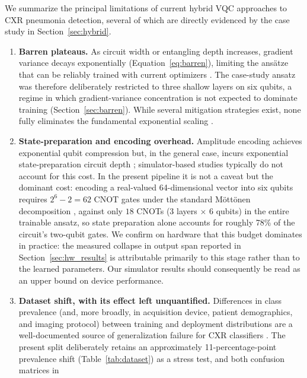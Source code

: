 \documentclass[11pt,a4paper]{article}
\begin{document}
We summarize the principal limitations of current hybrid VQC approaches to CXR
pneumonia detection, several of which are directly evidenced by the case study
in Section~\ref{sec:hybrid}.

\begin{enumerate}[leftmargin=1.4em]
  \item \textbf{Barren plateaus.}  As circuit width or entangling depth
    increases, gradient variance decays exponentially
    (Equation~\ref{eq:barren}), limiting the ansätze that can be reliably
    trained with current optimizers \cite{mcclean2018,cerezo2021,marrero2021}.
    The case-study ansatz was therefore deliberately restricted to three
    shallow layers on six qubits, a regime in which gradient-variance
    concentration is not expected to dominate training
    (Section~\ref{sec:barren}).  While several mitigation strategies exist,
    none fully eliminates the fundamental exponential scaling
    \cite{kashif2023}.
  \item \textbf{State-preparation and encoding overhead.}  Amplitude encoding
    achieves exponential qubit compression but, in the general case, incurs
    exponential state-preparation circuit depth \cite{aaronson2015};
    simulator-based studies typically do not account for this cost.  In the
    present pipeline it is not a caveat but the dominant cost: encoding a
    real-valued 64-dimensional vector into six qubits requires $2^6 - 2 = 62$
    CNOT gates under the standard M\"ott\"onen decomposition
    \cite{mottonen2005}, against only $18$ CNOTs (3 layers $\times$ 6 qubits)
    in the entire trainable ansatz, so state preparation alone accounts for
    roughly 78\% of the circuit's two-qubit gates.  We confirm on hardware
    that this budget dominates in practice: the measured collapse in output
    span reported in Section~\ref{sec:hw_results} is attributable primarily to
    this stage rather than to the learned parameters.  Our simulator results
    should consequently be read as an upper bound on device performance.
  \item \textbf{Dataset shift, with its effect left unquantified.}  Differences in
    class prevalence (and, more broadly, in acquisition device, patient
    demographics, and imaging protocol) between training and deployment
    distributions are a well-documented source of generalization failure for
    CXR classifiers \cite{zech2018}.  The present split deliberately retains
    an approximately 11-percentage-point prevalence shift
    (Table~\ref{tab:dataset}) as a stress test, and both confusion matrices in

\end{enumerate}
\end{document}
